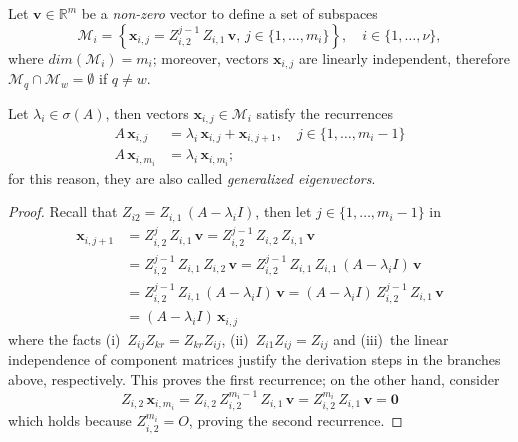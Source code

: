 \newpage

Let $\boldsymbol{v}\in\mathbb{R}^{m}$ be a \textit{non-zero} vector to
define a set of subspaces
\begin{displaymath}
\mathcal{M}_{i} = \left\lbrace \boldsymbol{x}_{i,j} = Z_{i,2}^{j-1}\,Z_{i,1}\,\boldsymbol{v},\,j\in\lbrace1,\ldots,m_{i}\rbrace\right\rbrace, \quad i\in \lbrace 1,\ldots,\nu \rbrace,
\end{displaymath}
where $dim(\mathcal{M}_{i})=m_{i}$; moreover, vectors $\boldsymbol{x}_{i,j}$ are
linearly independent, therefore $\mathcal{M}_{q}\cap\mathcal{M}_{w}=\emptyset$ if $q\neq w$.

\begin{lemma}
Let $\lambda_{i}\in\sigma(A)$, then vectors
$\boldsymbol{x}_{i,j}\in\mathcal{M}_{i}$ satisfy the recurrences
\begin{displaymath}
\begin{split}
A\,\boldsymbol{x}_{i,j} &= \lambda_{i}\,\boldsymbol{x}_{i,j} + \boldsymbol{x}_{i,j+1} , \quad j\in \lbrace 1,\ldots,m_{i}-1 \rbrace  \\
A\,\boldsymbol{x}_{i,m_{i}} &= \lambda_{i}\,\boldsymbol{x}_{i,m_{i}};
\end{split}
\end{displaymath}
for this reason, they are also called \textit{generalized eigenvectors}.
\end{lemma}
\begin{proof}
Recall that $Z_{i2} = Z_{i,1}\,(A-\lambda_{i}I)$, then let $ j\in \lbrace
1,\ldots,m_{i}-1 \rbrace $ in
\begin{displaymath}
\begin{split}
\boldsymbol{x}_{i,j+1} &= Z_{i,2}^{j}\,Z_{i,1}\,\boldsymbol{v} = Z_{i,2}^{j-1}\,Z_{i,2}\,Z_{i,1}\,\boldsymbol{v} \\
    &= Z_{i,2}^{j-1}\,Z_{i,1}\,Z_{i,2}\,\boldsymbol{v}
    = Z_{i,2}^{j-1}\,Z_{i,1}\,Z_{i,1}\,(A-\lambda_{i}I)\,\boldsymbol{v} \\
    &= Z_{i,2}^{j-1}\,Z_{i,1}\,(A-\lambda_{i}I)\,\boldsymbol{v}
    = (A-\lambda_{i}I)\,Z_{i,2}^{j-1}\,Z_{i,1}\,\boldsymbol{v} \\
    &= (A-\lambda_{i}I)\,\boldsymbol{x}_{i,j}
\end{split}
\end{displaymath}
where the facts (i)~$Z_{ij}Z_{kr}= Z_{kr}Z_{ij}$, (ii)~$Z_{i1}Z_{ij}=Z_{ij}$
and (iii)~the linear independence of component matrices justify the derivation
steps in the branches above, respectively. This proves the first recurrence; on
the other hand, consider
\begin{displaymath}
Z_{i,2}\,\boldsymbol{x}_{i,m_{i}} =  Z_{i,2}\,Z_{i,2}^{m_{i}-1}\,Z_{i,1}\,\boldsymbol{v} = Z_{i,2}^{m_{i}}\,Z_{i,1}\,\boldsymbol{v} = \boldsymbol{0}
\end{displaymath}
which holds because $Z_{i,2}^{m_{i}}=O$, proving the second recurrence.
\end{proof}


